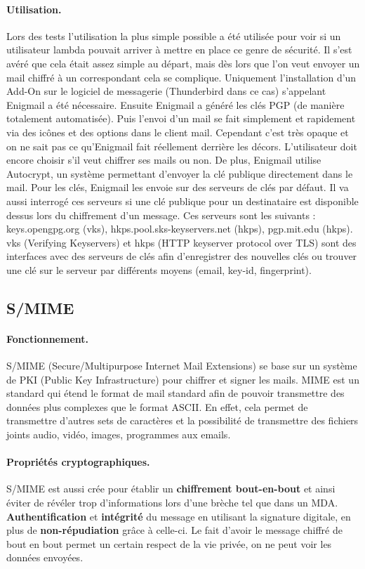 \paragraph*{Utilisation.}
Lors des tests l’utilisation la plus simple possible a été utilisée pour voir si un utilisateur lambda pouvait arriver à mettre en place ce genre de sécurité. Il s’est avéré que cela était assez simple au départ, mais dès lors que l'on veut envoyer un mail chiffré à un correspondant cela se complique. Uniquement l'installation d'un Add-On sur le logiciel de messagerie (Thunderbird dans ce cas) s’appelant Enigmail a été nécessaire. Ensuite Enigmail a généré les clés PGP (de manière totalement automatisée). Puis l'envoi d'un mail se fait simplement et rapidement via des icônes et des options dans le client mail. Cependant c’est très opaque et on ne sait pas ce qu'Enigmail fait réellement derrière les décors. L’utilisateur doit encore choisir s’il veut chiffrer ses mails ou non. De plus, Enigmail utilise Autocrypt, un système permettant d'envoyer la clé publique directement dans le mail. Pour les clés, Enigmail les envoie sur des serveurs de clés par défaut. Il va aussi interrogé ces serveurs si une clé publique pour un destinataire est disponible dessus lors du chiffrement d'un message. Ces serveurs sont les suivants : keys.opengpg.org (vks), hkps.pool.sks-keyservers.net (hkps), pgp.mit.edu (hkps). vks (Verifying Keyservers) et hkps (HTTP keyserver protocol over TLS) sont des interfaces avec des serveurs de clés afin d'enregistrer des nouvelles clés ou trouver une clé sur le serveur par différents moyens (email, key-id, fingerprint).
\subsection{S/MIME}
\label{protocols:SMIME}
\paragraph*{Fonctionnement.}
S/MIME (Secure/Multipurpose Internet Mail Extensions) se base sur un système de PKI (Public Key Infrastructure) pour chiffrer et signer les mails. MIME est un standard qui étend le format de mail standard afin de pouvoir transmettre des données plus complexes que le format ASCII. En effet, cela permet de transmettre d'autres sets de caractères et la possibilité de transmettre des fichiers joints audio, vidéo, images, programmes aux emails.
\paragraph*{Propriétés cryptographiques.}
S/MIME est aussi crée pour établir un \textbf{chiffrement bout-en-bout} et ainsi éviter de révéler trop d'informations lors d'une brèche tel que dans un MDA. 
\textbf{Authentification} et \textbf{intégrité} du message en utilisant la signature digitale, en plus de \textbf{non-répudiation} grâce à celle-ci. Le fait d'avoir le message chiffré de bout en bout permet un certain respect de la vie privée, on ne peut voir les données envoyées.
